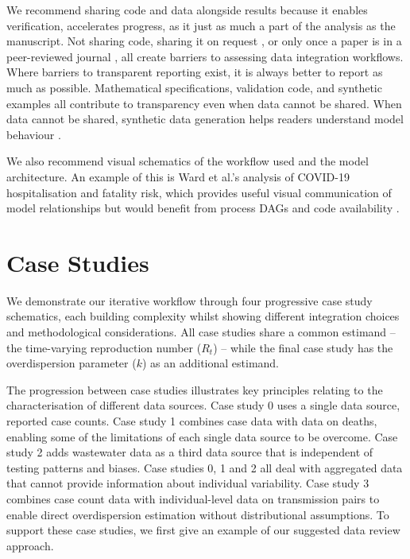 \documentclass{article}
\begin{document}
We recommend sharing code and data alongside results because it enables verification, accelerates progress, as it just as much a part of the analysis as the manuscript.
Not sharing code, sharing it on request \citep{Ward2024-sp}, or only once a paper is in a peer-reviewed journal \citep{Fyles2024-qz} , all create barriers to assessing data integration workflows.
Where barriers to transparent reporting exist, it is always better to report as much as possible.
Mathematical specifications, validation code, and synthetic examples all contribute to transparency even when data cannot be shared.
When data cannot be shared, synthetic data generation helps readers understand model behaviour \citep{Mellor2025-norovirus}.

We also recommend visual schematics of the workflow used and the model architecture. An example of this is Ward et al.'s analysis of COVID-19 hospitalisation and fatality risk, which provides useful visual communication of model relationships but would benefit from process DAGs and code availability \citep{Ward2024-sp}.

\section{Case Studies}

We demonstrate our iterative workflow through four progressive case study schematics, each building complexity whilst showing different integration choices and methodological considerations.
All case studies share a common estimand -- the time-varying reproduction number ($R_t$) -- while the final case study has the overdispersion parameter ($k$) as an additional estimand.

The progression between case studies illustrates key principles relating to the characterisation of different data sources. Case study 0 uses a single data source, reported case counts. Case study 1 combines case data with data on deaths, enabling some of the limitations of each single data source to be overcome. Case study 2 adds wastewater data as a third data source that is independent of testing patterns and biases. Case studies 0, 1 and 2 all deal with aggregated data that cannot provide information about individual variability. Case study 3 combines case count data with individual-level data on transmission pairs to enable direct overdispersion estimation without distributional assumptions.
To support these case studies, we first give an example of our suggested data review approach.
\end{document}

